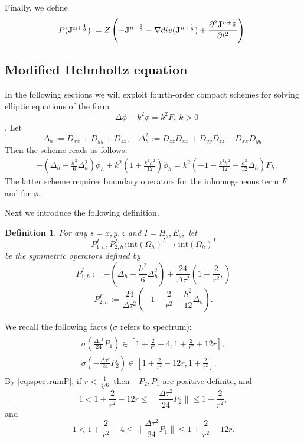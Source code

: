 \documentclass[12pt,reqno]{amsart}
\newtheorem{defi}[theorem]{Definition}
\theoremstyle{definition}
\numberwithin{equation}{section}
\newcommand{\intr}[1]{\mathrm{int}(#1)}
\def\Gwh{\Omega_h}
\begin{document}


	
	Finally, we define 
	$$
	P({\bf J^{n+\frac{1}{2}}}):=Z\left ( -{\bf J}^{n+\frac{1}{2}}-\nabla div({\bf J}^{n+\frac{1}{2}})+\frac{\partial^2{\bf J}^{n+\frac{1}{2}}}{\partial t^2}\right ).
	$$
   \subsection{Modified Helmholtz equation}
   In the following sections we will exploit fourth-order compact schemes for solving elliptic equations of the form $$-\Delta \phi+k^2\phi=k^2F, \ k>0$$ \cite{singer_turkel}.
Let 
$$
\Delta_h:=D_{xx}+D_{yy}+D_{zz}, \quad \Delta^2_h:= D_{zz}D_{xx}+D_{yy}D_{zz}+D_{xx}D_{yy}.
$$
Then the scheme reads as follows.
\begin{align*}
	&
	-\left (
	\Delta_h+\frac{h^2}{6}\Delta^2_h
	\right)\phi_h+
	k^2\left (
	1+\frac{k^2h^2}{12}
	\right)\phi_h=
	k^2\left (
	-1-\frac{k^2h^2}{12}
	-\frac{h^2}{12}\Delta_h
	\right)F_h.
\end{align*}
The latter scheme requires boundary operators for the inhomogeneous term $F$ and for $\phi$. 

Next we introduce the following definition.
	\begin{defi}
	For any $s=x,y,z$ and $I= H_s, E_s,$
	let $$P_{1,h}^{I}, P_{2,h}^{I}:\intr\Gwh^{I}\to \intr\Gwh^{I}$$ be the symmetric operators defined by
	$$
	P_{1,h}^{I}:=-\left (\Delta_h+\frac{h^2}{6}\Delta_h^2\right)+\frac{24}{\Delta \tau^2}\left (
	1+\frac{2}{r^2},
	\right)
	$$
	$$
	P_{2,h}^{I}:=\frac{24}{\Delta \tau^2}\left (
	-1-\frac{2}{r^2}-\frac{h^2}{12}\Delta_h
	\right).
	$$	
	
	
\end{defi}
We recall the following facts ($\sigma$ refers to spectrum):
\begin{align}
	\label{eq:spectrumP}
	\begin{split}
		\sigma(\frac{\Delta \tau^2}{24} P_1)\in [1+\frac{2}{r^2}-4,1+\frac{2}{r^2}+12r] ,
		\\
		\sigma(-\frac{\Delta \tau^2}{24} P_2)\in [1+\frac{2}{r^2}-12r, 1+\frac{2}{r^2}].
	\end{split}
\end{align}
By \eqref{eq:spectrumP}, if $r<\frac{1}{\sqrt[3]{6}}$
then $-P_2, P_1$ are positive definite, and
$$
1<1+\frac{2}{r^2}-12r\leq \|\frac{\Delta \tau^2}{24}P_2\|\leq 1+\frac{2}{r^2},
$$
and 
$$
1<1+\frac{2}{r^2}-4\leq\|\frac{\Delta \tau^2}{24}P_1\|\leq 1+\frac{2}{r^2}+12r.
$$
\end{document}
